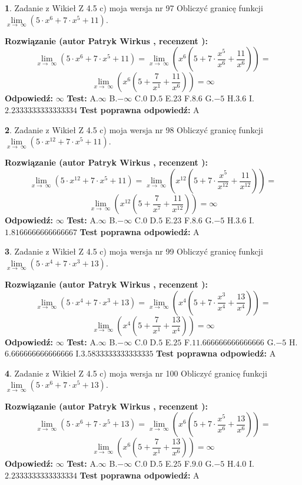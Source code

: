 \documentclass[12pt, a4paper]{article}
\theoremstyle{definition} %
\newtheorem{zad}{}
\newcommand{\zadStart}[1]{\begin{zad}#1\newline}
\newcommand{\zadStop}{\end{zad}}
\newcommand{\rozwStart}[2]{\noindent \textbf{Rozwiązanie (autor #1 , recenzent #2): }\newline}
\newcommand{\rozwStop}{\newline}
\newcommand{\odpStart}{\noindent \textbf{Odpowiedź:}\newline}
\newcommand{\odpStop}{\newline}
\newcommand{\testStart}{\noindent \textbf{Test:}\newline}
\newcommand{\testStop}{\newline}
\newcommand{\kluczStart}{\noindent \textbf{Test poprawna odpowiedź:}\newline}
\newcommand{\kluczStop}{\newline}
\begin{document}
\zadStart{Zadanie z Wikieł Z 4.5 c) moja wersja nr 97}
Obliczyć granicę funkcji  $\lim\limits_{x\to\ \infty}(5 \cdot x^{6}+7 \cdot x^{5}+11)$.
\zadStop
\rozwStart{Patryk Wirkus}{}
$$\lim\limits_{x\to\ \infty}(5 \cdot x^{6}+7 \cdot x^{5}+11) = \lim\limits_{x\to\ \infty}(x^{6}(5 +7 \cdot \frac{x^{5}}{x^{6}}+\frac{11}{x^{6}})) =$$ $$\lim\limits_{x\to\ \infty}(x^{6}(5 +\frac{7}{x^{1}}+\frac{11}{x^{6}})) =\infty$$
\rozwStop
\odpStart
$\infty$
\odpStop
\testStart
A.$\infty$ B.$-\infty$ C.$0$ D.$5$ E.$23$
F.$8.6$ G.$-5$
H.$3.6$
I.$2.2333333333333334$
\testStop
\kluczStart
A
\kluczStop



\zadStart{Zadanie z Wikieł Z 4.5 c) moja wersja nr 98}
Obliczyć granicę funkcji  $\lim\limits_{x\to\ \infty}(5 \cdot x^{12}+7 \cdot x^{5}+11)$.
\zadStop
\rozwStart{Patryk Wirkus}{}
$$\lim\limits_{x\to\ \infty}(5 \cdot x^{12}+7 \cdot x^{5}+11) = \lim\limits_{x\to\ \infty}(x^{12}(5 +7 \cdot \frac{x^{5}}{x^{12}}+\frac{11}{x^{12}})) =$$ $$\lim\limits_{x\to\ \infty}(x^{12}(5 +\frac{7}{x^{7}}+\frac{11}{x^{12}})) =\infty$$
\rozwStop
\odpStart
$\infty$
\odpStop
\testStart
A.$\infty$ B.$-\infty$ C.$0$ D.$5$ E.$23$
F.$8.6$ G.$-5$
H.$3.6$
I.$1.8166666666666667$
\testStop
\kluczStart
A
\kluczStop



\zadStart{Zadanie z Wikieł Z 4.5 c) moja wersja nr 99}
Obliczyć granicę funkcji  $\lim\limits_{x\to\ \infty}(5 \cdot x^{4}+7 \cdot x^{3}+13)$.
\zadStop
\rozwStart{Patryk Wirkus}{}
$$\lim\limits_{x\to\ \infty}(5 \cdot x^{4}+7 \cdot x^{3}+13) = \lim\limits_{x\to\ \infty}(x^{4}(5 +7 \cdot \frac{x^{3}}{x^{4}}+\frac{13}{x^{4}})) =$$ $$\lim\limits_{x\to\ \infty}(x^{4}(5 +\frac{7}{x^{1}}+\frac{13}{x^{4}})) =\infty$$
\rozwStop
\odpStart
$\infty$
\odpStop
\testStart
A.$\infty$ B.$-\infty$ C.$0$ D.$5$ E.$25$
F.$11.666666666666666$ G.$-5$
H.$6.666666666666666$
I.$3.5833333333333335$
\testStop
\kluczStart
A
\kluczStop



\zadStart{Zadanie z Wikieł Z 4.5 c) moja wersja nr 100}
Obliczyć granicę funkcji  $\lim\limits_{x\to\ \infty}(5 \cdot x^{6}+7 \cdot x^{5}+13)$.
\zadStop
\rozwStart{Patryk Wirkus}{}
$$\lim\limits_{x\to\ \infty}(5 \cdot x^{6}+7 \cdot x^{5}+13) = \lim\limits_{x\to\ \infty}(x^{6}(5 +7 \cdot \frac{x^{5}}{x^{6}}+\frac{13}{x^{6}})) =$$ $$\lim\limits_{x\to\ \infty}(x^{6}(5 +\frac{7}{x^{1}}+\frac{13}{x^{6}})) =\infty$$
\rozwStop
\odpStart
$\infty$
\odpStop
\testStart
A.$\infty$ B.$-\infty$ C.$0$ D.$5$ E.$25$
F.$9.0$ G.$-5$
H.$4.0$
I.$2.2333333333333334$
\testStop
\kluczStart
A
\kluczStop
\end{document}
